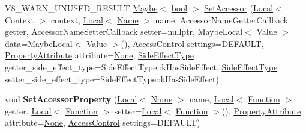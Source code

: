 \begin{DoxyCompactItemize}
\item 
V8\+\_\+\+W\+A\+R\+N\+\_\+\+U\+N\+U\+S\+E\+D\+\_\+\+R\+E\+S\+U\+LT \mbox{\hyperlink{classv8_1_1Maybe}{Maybe}}$<$ \mbox{\hyperlink{classbool}{bool}} $>$ \mbox{\hyperlink{classv8_1_1Object_a3fb94f6679be1479ee19cc21e33ccb12}{Set\+Accessor}} (\mbox{\hyperlink{classv8_1_1Local}{Local}}$<$ Context $>$ context, \mbox{\hyperlink{classv8_1_1Local}{Local}}$<$ \mbox{\hyperlink{classv8_1_1Name}{Name}} $>$ name, Accessor\+Name\+Getter\+Callback getter, Accessor\+Name\+Setter\+Callback setter=nullptr, \mbox{\hyperlink{classv8_1_1MaybeLocal}{Maybe\+Local}}$<$ \mbox{\hyperlink{classv8_1_1Value}{Value}} $>$ data=\mbox{\hyperlink{classv8_1_1MaybeLocal}{Maybe\+Local}}$<$ \mbox{\hyperlink{classv8_1_1Value}{Value}} $>$(), \mbox{\hyperlink{namespacev8_a31d8355cb043d7d2dda3f4a52760b64e}{Access\+Control}} settings=D\+E\+F\+A\+U\+LT, \mbox{\hyperlink{namespacev8_a05f25f935e108a1ea2d150e274602b87}{Property\+Attribute}} attribute=\mbox{\hyperlink{namespacev8_a05f25f935e108a1ea2d150e274602b87a7ab4d58719c33b3ea2dfaefa29b111df}{None}}, \mbox{\hyperlink{namespacev8_a29711319c2b9fc7716d65faee2f7b9cb}{Side\+Effect\+Type}} getter\+\_\+side\+\_\+effect\+\_\+type=Side\+Effect\+Type\+::k\+Has\+Side\+Effect, \mbox{\hyperlink{namespacev8_a29711319c2b9fc7716d65faee2f7b9cb}{Side\+Effect\+Type}} setter\+\_\+side\+\_\+effect\+\_\+type=Side\+Effect\+Type\+::k\+Has\+Side\+Effect)
\item 
\mbox{\label{classv8_1_1Object_a284911d760fc853d81adf98c242bc453}} 
void {\bfseries Set\+Accessor\+Property} (\mbox{\hyperlink{classv8_1_1Local}{Local}}$<$ \mbox{\hyperlink{classv8_1_1Name}{Name}} $>$ name, \mbox{\hyperlink{classv8_1_1Local}{Local}}$<$ \mbox{\hyperlink{classv8_1_1Function}{Function}} $>$ getter, \mbox{\hyperlink{classv8_1_1Local}{Local}}$<$ \mbox{\hyperlink{classv8_1_1Function}{Function}} $>$ setter=\mbox{\hyperlink{classv8_1_1Local}{Local}}$<$ \mbox{\hyperlink{classv8_1_1Function}{Function}} $>$(), \mbox{\hyperlink{namespacev8_a05f25f935e108a1ea2d150e274602b87}{Property\+Attribute}} attribute=\mbox{\hyperlink{namespacev8_a05f25f935e108a1ea2d150e274602b87a7ab4d58719c33b3ea2dfaefa29b111df}{None}}, \mbox{\hyperlink{namespacev8_a31d8355cb043d7d2dda3f4a52760b64e}{Access\+Control}} settings=D\+E\+F\+A\+U\+LT)
\item 

\end{DoxyCompactItemize}
